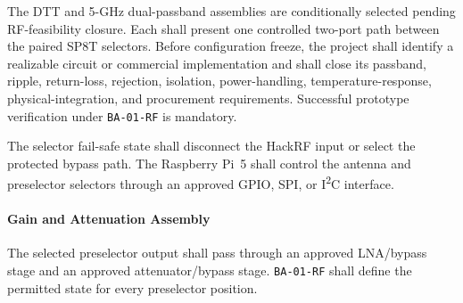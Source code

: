 \documentclass[11pt,a4paper]{article}
\begin{document}
	The DTT and 5-GHz dual-passband assemblies are conditionally selected pending
	RF-feasibility closure. Each shall present one controlled two-port path between
	the paired SP8T selectors. Before configuration freeze, the project shall
	identify a realizable circuit or commercial implementation and shall close its
	passband, ripple, return-loss, rejection, isolation, power-handling,
	temperature-response, physical-integration, and procurement requirements.
	Successful prototype verification under \texttt{BA-01-RF} is mandatory.
	
	The selector fail-safe state shall disconnect the HackRF input or select the
	protected bypass path. The Raspberry Pi~5 shall control the antenna and
	preselector selectors through an approved GPIO, SPI, or
	I\textsuperscript{2}C interface.
	
	\paragraph*{Gain and Attenuation Assembly}
	
	The selected preselector output shall pass through an approved LNA/bypass
	stage and an approved attenuator/bypass stage. \texttt{BA-01-RF} shall define
	the permitted state for every preselector position.
	
\end{document}
